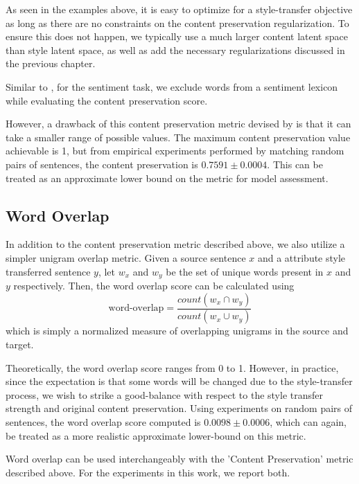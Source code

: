 As seen in the examples above, it is easy to optimize for a style-transfer objective as long as there are no constraints on the content preservation regularization. To ensure this does not happen, we typically use a much larger content latent space than style latent space, as well as add the necessary regularizations discussed in the previous chapter.

Similar to \cite{fu2017style}, for the sentiment task, we exclude words from a sentiment lexicon \citep{hu2004mining} while evaluating the content preservation score.

However, a drawback of this content preservation metric devised by \cite{fu2017style} is that it can take a smaller range of possible values. The maximum content preservation value achievable is 1, but from empirical experiments performed by matching random pairs of sentences, the content preservation is $0.7591 \pm 0.0004$. This can be treated as an approximate lower bound on the metric for model assessment.

\subsection{Word Overlap}

In addition to the content preservation metric described above, we also utilize a simpler unigram overlap metric. Given a source sentence $x$ and a attribute style transferred sentence $y$, let $w_x$ and $w_y$ be the set of unique words present in $x$ and $y$ respectively. Then, the word overlap score can be calculated using
\begin{equation*}
	\text{word-overlap} = \frac{count(w_x \cap w_y)}{count(w_x \cup w_y)}
\end{equation*}
which is simply a normalized measure of overlapping unigrams in the source and target.

Theoretically, the word overlap score ranges from 0 to 1. However, in practice, since the expectation is that some words will be changed due to the style-transfer process, we wish to strike a good-balance with respect to the style transfer strength and original content preservation. Using experiments on random pairs of sentences, the word overlap score computed is $0.0098 \pm 0.0006$, which can again, be treated as a more realistic approximate lower-bound on this metric.

Word overlap can be used interchangeably with the 'Content Preservation' metric described above. For the experiments in this work, we report both.


